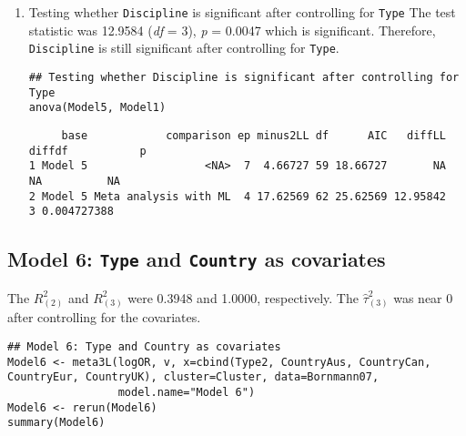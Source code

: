 \documentclass[11pt]{article}
\begin{document}
\begin{enumerate}
\item Testing whether \texttt{Discipline} is significant after controlling for \texttt{Type}
\label{sec:org17b35c9}
The test statistic was 12.9584 (\emph{df} = 3), \emph{p} = 0.0047 which is significant. Therefore, \texttt{Discipline} is still significant after controlling for \texttt{Type}.
\begin{verbatim}
## Testing whether Discipline is significant after controlling for Type
anova(Model5, Model1)
\end{verbatim}

\begin{verbatim}
     base            comparison ep minus2LL df      AIC   diffLL diffdf           p
1 Model 5                  <NA>  7  4.66727 59 18.66727       NA     NA          NA
2 Model 5 Meta analysis with ML  4 17.62569 62 25.62569 12.95842      3 0.004727388
\end{verbatim}
\end{enumerate}

\subsection{Model 6: \texttt{Type} and \texttt{Country} as covariates}
\label{sec:orga15eabc}
The \(R^2_{(2)}\) and \(R^2_{(3)}\) were 0.3948 and 1.0000, respectively. The \(\hat{\tau}^2_{(3)}\) was near 0 after controlling for the covariates.

\begin{verbatim}
## Model 6: Type and Country as covariates
Model6 <- meta3L(logOR, v, x=cbind(Type2, CountryAus, CountryCan, CountryEur, CountryUK), cluster=Cluster, data=Bornmann07,
                 model.name="Model 6")
Model6 <- rerun(Model6)
summary(Model6)
\end{verbatim}
\end{document}
